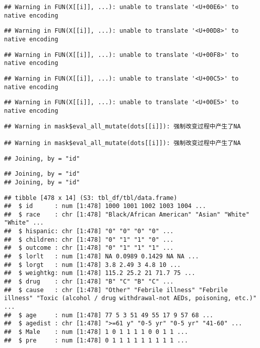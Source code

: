 \documentclass[
]{article}
\begin{document}
\begin{verbatim}
## Warning in FUN(X[[i]], ...): unable to translate '<U+00E6>' to native encoding
\end{verbatim}

\begin{verbatim}
## Warning in FUN(X[[i]], ...): unable to translate '<U+00D8>' to native encoding
\end{verbatim}

\begin{verbatim}
## Warning in FUN(X[[i]], ...): unable to translate '<U+00F8>' to native encoding
\end{verbatim}

\begin{verbatim}
## Warning in FUN(X[[i]], ...): unable to translate '<U+00C5>' to native encoding
\end{verbatim}

\begin{verbatim}
## Warning in FUN(X[[i]], ...): unable to translate '<U+00E5>' to native encoding
\end{verbatim}

\begin{verbatim}
## Warning in mask$eval_all_mutate(dots[[i]]): 强制改变过程中产生了NA

## Warning in mask$eval_all_mutate(dots[[i]]): 强制改变过程中产生了NA
\end{verbatim}

\begin{verbatim}
## Joining, by = "id"
\end{verbatim}

\begin{verbatim}
## Joining, by = "id"
## Joining, by = "id"
\end{verbatim}

\begin{verbatim}
## tibble [478 x 14] (S3: tbl_df/tbl/data.frame)
##  $ id      : num [1:478] 1000 1001 1002 1003 1004 ...
##  $ race    : chr [1:478] "Black/African American" "Asian" "White" "White" ...
##  $ hispanic: chr [1:478] "0" "0" "0" "0" ...
##  $ children: chr [1:478] "0" "1" "1" "0" ...
##  $ outcome : chr [1:478] "0" "1" "1" "1" ...
##  $ lorlt   : num [1:478] NA 0.0989 0.1429 NA NA ...
##  $ lorgt   : num [1:478] 3.8 2.49 3 4.8 10 ...
##  $ weightkg: num [1:478] 115.2 25.2 21 71.7 75 ...
##  $ drug    : chr [1:478] "B" "C" "B" "C" ...
##  $ cause   : chr [1:478] "Other" "Febrile illness" "Febrile illness" "Toxic (alcohol / drug withdrawal-not AEDs, poisoning, etc.)" ...
##  $ age     : num [1:478] 77 5 3 51 49 55 17 9 57 68 ...
##  $ agedist : chr [1:478] ">=61 y" "0-5 yr" "0-5 yr" "41-60" ...
##  $ Male    : num [1:478] 1 0 1 1 1 1 0 0 1 1 ...
##  $ pre     : num [1:478] 0 1 1 1 1 1 1 1 1 1 ...
\end{verbatim}
\end{document}
